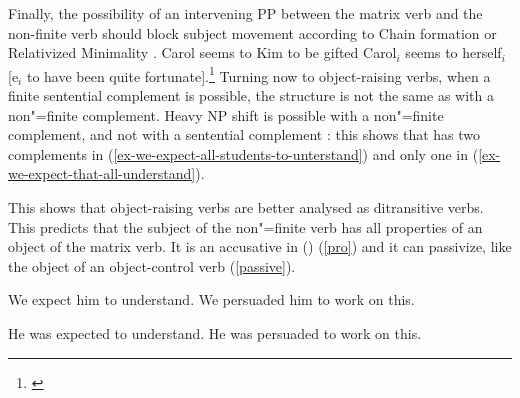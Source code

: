 Finally, the possibility of an intervening PP between the matrix verb and the non-finite verb should
block subject movement according to Chain formation or Relativized Minimality \citep{Rizzi1986,Rizzi1990a-something}\addpages.
\eal
\ex Carol seems to Kim to be gifted
\ex Carol$_i$ seems to herself$_i$ [e$_i$ to have been quite fortunate].\footnote{
\citet[]{McGinnis2004a-u}
}
\zl
{}
Turning now to object-raising verbs, when a finite sentential complement is possible, the structure
is not the same as  with a non"=finite complement. Heavy NP shift is possible with a non"=finite
complement, and not with a sentential complement \parencites[]{Bresnan1982}[]{PollardandSag1994}: this shows that  has two complements in (\ref{ex-we-expect-all-students-to-unterstand}) and only one in (\ref{ex-we-expect-that-all-understand}).

\eal
{}
\zl



\noindent
This shows that object-raising verbs are better analysed as ditransitive verbs. This predicts that the subject of the non"=finite verb has all properties of an object of the matrix verb. It is an accusative in  () (\ref{pro}) and it can passivize, like the object of an object-control verb (\ref{passive}).

\begin{exe}
\ex
\begin{xlist} \label{pro}
\ex We expect him to understand.
\ex  We persuaded him to work on this.
\end{xlist}
\ex \begin{xlist} \label{passive}
\ex  He was expected to understand.
\ex  He was persuaded to work on this.
\end{xlist}
	
\end{exe}


